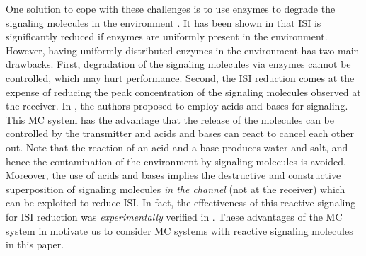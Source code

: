 \documentclass[conference]{IEEEtran}
\begin{document}
One solution to cope with these challenges is to use enzymes to degrade the signaling molecules in the environment \cite{Adam_Enzyme}. It has been shown in \cite{Adam_Enzyme} that ISI is significantly reduced if enzymes are uniformly present in the environment. However, having uniformly distributed enzymes in the environment has two main drawbacks. First,   degradation of the signaling molecules via enzymes cannot be controlled, which may hurt performance.  Second, the ISI reduction comes at the expense of  reducing the peak concentration of the signaling molecules observed at the receiver.  In \cite{Nariman_Acid}, the authors proposed to employ acids and bases for  signaling. This MC system has the advantage that the release of the molecules can be controlled by the transmitter and acids and bases can react to cancel each other out. Note that the reaction of an acid and a base produces water and salt, and hence the contamination of the environment by signaling molecules is avoided. Moreover, the use of acids and bases implies the destructive and constructive superposition of signaling molecules \textit{in the channel} (not at the receiver) which can be exploited to reduce ISI. In fact, the effectiveness of this reactive signaling for ISI reduction  was \textit{experimentally} verified in \cite{Nariman_AcidBasePlatform}. These advantages of the MC system in \cite{Nariman_Acid,Nariman_AcidBasePlatform} motivate us to consider MC systems with reactive signaling molecules in this paper.
\end{document}
